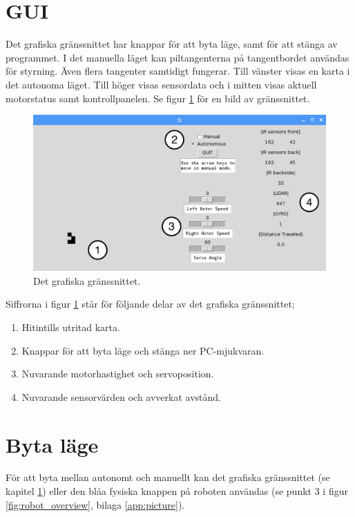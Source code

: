 \documentclass[a4paper,11pt]{article}
\begin{document}
\section{GUI}\label{sec:gui}
Det grafiska gränssnittet har knappar för att byta läge, samt för att stänga av programmet. I det manuella läget kan piltangenterna på tangentbordet användas för styrning. Även flera tangenter samtidigt fungerar. Till vänster visas en karta i det autonoma läget. Till höger visas sensordata och i mitten visas aktuell motorstatus samt kontrollpanelen. Se figur \ref{fig:gui} för en bild av gränssnittet.

\begin{figure}[h!]
    \centering
    \includegraphics[scale=0.55]{gui_annotated.png}
    \caption{Det grafiska gränssnittet.}
    \label{fig:gui}
\end{figure}

Siffrorna i figur \ref{fig:gui} står för följande delar av det grafiska gränssnittet;
\begin{enumerate}
\item Hitintills utritad karta.
\item Knappar för att byta läge och stänga ner PC-mjukvaran.
\item Nuvarande motorhastighet och servoposition.
\item Nuvarande sensorvärden och avverkat avstånd.
\end{enumerate}

\section{Byta läge}
För att byta mellan autonomt och manuellt kan det grafiska gränssnittet (se kapitel \ref{sec:gui}) eller den blåa fysiska knappen på roboten användas (se punkt 3 i figur \ref{fig:robot_overview}, bilaga \ref{app:picture}).
\end{document}
